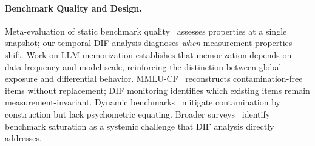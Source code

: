 \paragraph{Benchmark Quality and Design.}
Meta-evaluation of static benchmark quality~\citep{zhu2026bhi} assesses properties at a single snapshot; our temporal DIF analysis diagnoses \emph{when} measurement properties shift. Work on LLM memorization \citep{carlini2022quantifying} establishes that memorization depends on data frequency and model scale, reinforcing the distinction between global exposure and differential behavior. MMLU-CF~\citep{zhao2025mmlucf} reconstructs contamination-free items without replacement; DIF monitoring identifies which existing items remain measurement-invariant. Dynamic benchmarks~\citep{kiela2021dynabench} mitigate contamination by construction but lack psychometric equating. Broader surveys~\citep{chang2024survey} identify benchmark saturation as a systemic challenge that DIF analysis directly addresses.
